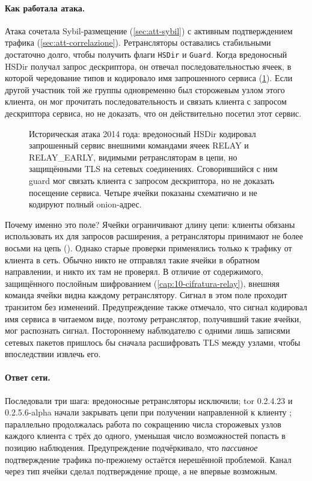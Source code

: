 \paragraph{Как работала атака.} Атака сочетала Sybil-размещение (\cref{sec:att-sybil}) с активным подтверждением трафика (\cref{sec:att-correlazione}). Ретрансляторы оставались стабильными достаточно долго, чтобы получить флаги \texttt{HSDir} и \texttt{Guard}. Когда вредоносный HSDir получал запрос дескриптора, он отвечал последовательностью ячеек, в которой чередование типов  и  кодировало имя запрошенного сервиса (\cref{fig:relayearly}). Если другой участник той же группы одновременно был сторожевым узлом этого клиента, он мог прочитать последовательность и связать клиента с запросом дескриптора сервиса, но не доказать, что он действительно посетил этот сервис.

\begin{figure}[htbp]
\centering

\caption{Историческая атака 2014 года: вредоносный HSDir кодировал запрошенный сервис внешними командами ячеек RELAY и RELAY\_EARLY, видимыми ретрансляторам в цепи, но защищёнными TLS на сетевых соединениях. Сговорившийся с ним guard мог связать клиента с запросом дескриптора, но не доказать посещение сервиса. Четыре ячейки показаны схематично и не кодируют полный onion-адрес.}
\label{fig:relayearly}
\end{figure}

Почему именно это поле? Ячейки  ограничивают длину цепи: клиенты обязаны использовать их для запросов расширения, а ретрансляторы принимают не более восьми на цепь (). Однако старые проверки применялись только к трафику от клиента в сеть. Обычно никто не отправлял такие ячейки в обратном направлении, и никто их там не проверял. В отличие от содержимого, защищённого послойным шифрованием (\cref{cap:10-cifratura-relay}), внешняя команда ячейки видна каждому ретранслятору. Сигнал в этом поле проходит транзитом без изменений. Предупреждение также отмечало, что сигнал кодировал имя сервиса в читаемом виде, поэтому ретранслятор, получивший такие ячейки, мог распознать сигнал. Постороннему наблюдателю с одними лишь записями сетевых пакетов пришлось бы сначала расшифровать TLS между узлами, чтобы впоследствии извлечь его.

\paragraph{Ответ сети.} Последовали три шага: вредоносные ретрансляторы исключили; tor 0.2.4.23 и 0.2.5.6-alpha начали закрывать цепи при получении направленной к клиенту ; параллельно продолжалась работа по сокращению числа сторожевых узлов каждого клиента с трёх до одного, уменьшая число возможностей попасть в позицию наблюдения. Предупреждение подчёркивало, что \emph{пассивное} подтверждение трафика по-прежнему остаётся нерешённой проблемой. Канал через тип ячейки сделал подтверждение проще, а не впервые возможным.

